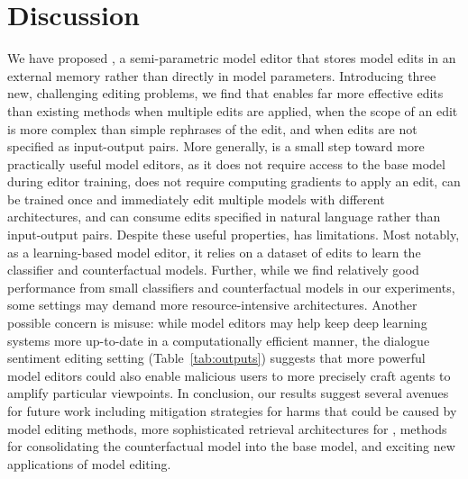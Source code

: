 \documentclass{article}
\begin{document}
\section{Discussion}

We have proposed {\name}, a semi-parametric model editor that stores model edits in an external memory rather than directly in model parameters. Introducing three new, challenging editing problems, we find that {\name} enables far more effective edits than existing methods when multiple edits are applied, when the scope of an edit is more complex than simple rephrases of the edit, and when edits are not specified as input-output pairs. More generally, {\name} is a small step toward more practically useful model editors, as it does not require access to the base model during editor training, does not require computing gradients to apply an edit, can be trained once and immediately edit multiple models with different architectures, and can consume edits specified in natural language rather than input-output pairs. Despite these useful properties, {\name} has limitations. Most notably, as a learning-based model editor, it relies on a dataset of edits to learn the classifier and counterfactual models. Further, while we find relatively good performance from small classifiers and counterfactual models in our experiments, some settings may demand more resource-intensive architectures. Another possible concern is misuse: while model editors may help keep deep learning systems more up-to-date in a computationally efficient manner, the dialogue sentiment editing setting (Table~\ref{tab:outputs}) suggests that more powerful model editors could also enable malicious users to more precisely craft agents to amplify particular viewpoints. In conclusion, our results suggest several avenues for future work including mitigation strategies for harms that could be caused by model editing methods, more sophisticated retrieval architectures for {\name}, methods for consolidating the counterfactual model into the base model, and exciting new applications of model editing.

\clearpage




\appendix


\end{document}
